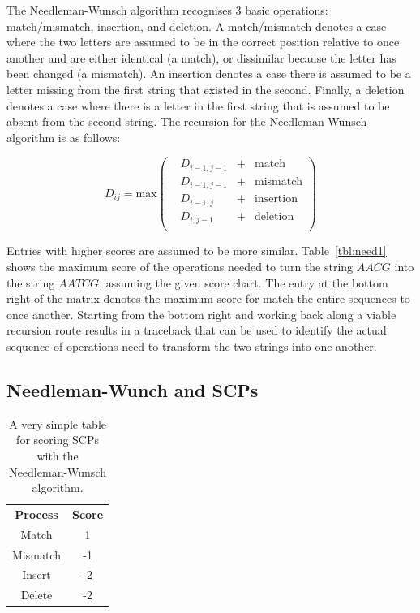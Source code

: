 \documentclass{article}
\begin{document}
The Needleman-Wunsch algorithm recognises 3 basic operations: match/mismatch, insertion, and deletion. A match/mismatch denotes a case where the two letters are assumed to be in the correct position relative to once another and are either identical (a match), or dissimilar because the letter has been changed (a mismatch). An insertion denotes a case there is assumed to be a letter missing from the first string that existed in the second. Finally, a deletion denotes a case where there is a letter in the first string that is assumed to be absent from the second string. The recursion for the Needleman-Wunsch algorithm is as follows:

\begin{equation}
 D_{ij} = \textrm{max} \left( \begin{matrix} 
      & D_{i-1,j-1} & + &\textrm{match}  \\
     &  D_{i-1,j-1} & + &\textrm{mismatch}  \\
      & D_{i-1,j} & + &\textrm{insertion}   \\
     & D_{i,j-1} & + &\textrm{deletion}   \\
   \end{matrix} \right)
\end{equation}

Entries with higher scores are assumed to be more similar. Table~\ref{tbl:need1} shows the maximum score of the operations needed to turn the string $AACG$ into the string $AATCG$, assuming the given score chart. The entry at the bottom right of the matrix denotes the maximum score for match the entire sequences to once another. Starting from the bottom right and working back along a viable recursion route results in a traceback that can be used to identify the actual sequence of operations need to transform the two strings into one another.

\subsection{Needleman-Wunch and SCPs}

\begin{table}
\begin{center}

\begin{tabular}{ c c }
 \textbf{Process} & \textbf{Score} \\ 
 Match & 1 \\
 Mismatch & -1 \\
 Insert & -2 \\
 Delete & -2
\end{tabular}
\caption{A very simple table for scoring SCPs with the Needleman-Wunsch algorithm.}
\label{tbl:simpleneed}

\end{center}
\end{table}
\end{document}
